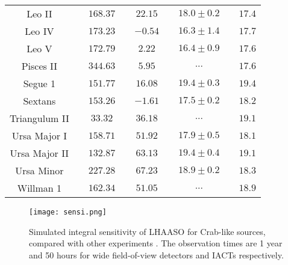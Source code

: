 \documentclass[12pt,prd,showpacs,amsmath,amssymb,aps,floats,floatfix,nofootinbib]{revtex4-1}
\begin{document}
\begin{table*}
\begin{tabular}{ccccccccc}
        Leo II&&
		$168.37$&&
		$22.15$&&
		$18.0\pm0.2$&&
		$17.4$\\

        Leo IV&&
		$173.23$&&
		$-0.54$&&
		$16.3\pm1.4$&&
		$17.7$\\

        Leo V&&
		$172.79$&&
		$2.22$&&
		$16.4\pm0.9$&&
		$17.6$\\

        Pisces II&&
		$344.63$&&
		$5.95$&&
		$...$&&
		$17.6$\\

        Segue 1&&
		$151.77$&&
		$16.08$&&
		$19.4\pm0.3$&&
		$19.4$\\

        Sextans&&
		$153.26$&&
		$-1.61$&&
		$17.5\pm0.2$&&
		$18.2$\\

        Triangulum II&&
		$33.32$&&
		$36.18$&&
		$...$&&
		$19.1$\\

        Ursa Major I&&
		$158.71$&&
		$51.92$&&
		$17.9\pm0.5$&&
		$18.1$\\

        Ursa Major II&&
		$132.87$&&
		$63.13$&&
		$19.4\pm0.4$&&
		$19.1$\\

        Ursa Minor&&
		$227.28$&&
		$67.23$&&
		$18.9\pm0.2$&&
		$18.3$\\

        Willman 1&&
		$162.34$&&
		$51.05$&&
		$...$&&
		$18.9$\\\hline


    \hline\hline
	\end{tabular}
   \end{table*}

\begin{figure*}
\texttt{[image: sensi.png]}
\caption{Simulated integral sensitivity of LHAASO for Crab-like sources, compared with other experiments \cite{Acharya:2013sxa,Cao:2014rla}. The observation times
are 1 year and 50 hours for wide field-of-view detectors and IACTs respectively. }
\label{fig:integral-sensi}
\end{figure*}
\end{document}
